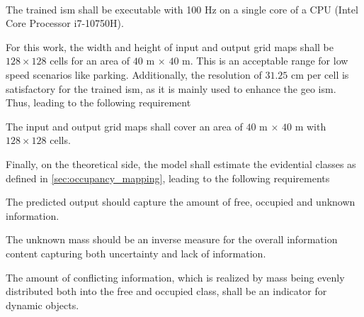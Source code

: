 \\
\begin{subreq} \label{subreq:resource_efficient_inference}
	The trained \gls{ism} shall be executable with 100 Hz on a single core of a CPU (Intel Core Processor i7-10750H).
\end{subreq}
For this work, the width and height of input and output grid maps shall be $128 \times 128$ cells for an area of $40$ m $\times$ $40$ m. This is an acceptable range for low speed scenarios like parking. Additionally, the resolution of $31.25$ cm per cell is satisfactory for the trained \gls{ism}, as it is mainly used to enhance the geo \gls{ism}. Thus, leading to the following requirement
\\
\begin{subreq} \label{subreq:grid_map_size}
	The input and output grid maps shall cover an area of $40$ m $\times$ $40$ m with $128 \times 128$ cells.
\end{subreq}
Finally, on the theoretical side, the model shall estimate the evidential classes as defined in \ref{sec:occupancy_mapping}, leading to the following requirements
\\
\begin{subreq} \label{subreq:ev_rep}
	The predicted output should capture the amount of free, occupied and unknown information.
\end{subreq}
\begin{subreq} \label{subreq:unknown_mass}
	The unknown mass should be an inverse measure for the overall information content capturing both uncertainty and lack of information.
\end{subreq}
\begin{subreq} \label{subreq:conflicting_mass}
	The amount of conflicting information, which is realized by mass being evenly distributed both into the free and occupied class, shall be an indicator for dynamic objects.
\end{subreq}

%
